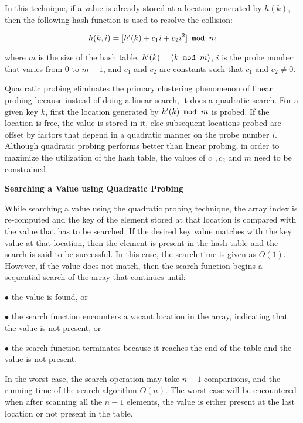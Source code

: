 \vskip 1mm
In this technique, if a value is already stored at a location generated by $h(k)$, then the following hash function is used to resolve the collision:

$$h(k,i)=[h'(k)+c_1i+c_2i^2]\hbox{\tt{} mod }m$$

where $m$ is the size of the hash table, $h'(k)=(k\hbox{\tt{} mod } m)$, $i$ is the probe number that varies from $0$ to $m-1$, and $c_1$ and $c_2$ are constants such that $c_1$ and $c_2\neq 0$.

\vskip 1mm
Quadratic probing eliminates the primary clustering phenomenon of linear probing because instead of doing a linear search, it does a quadratic search. For a given key $k$, first the location generated by $h'(k)\hbox{\tt{} mod }m$ is probed. If the location is free, the value is stored in it, else subsequent locations probed are offset by factors that depend in a quadratic manner on the probe number $i$. Although quadratic probing performs better than linear probing, in order to maximize the utilization of the hash table, the values of $c_1,c_2$ and $m$ need  to be constrained.

\vskip 3mm
{\bf Searching a Value using Quadratic Probing}

\vskip 1mm
While searching a value using the quadratic probing technique, the array index is re-computed and the key of the element stored at that location is compared with the value that has to be searched. If the desired key value matches with the key value at that location, then the element is present in the hash table and the search is said to be successful. In this case, the search time is given as $O(1)$. However, if the value does not match, then the search function begins a sequential search of the array that continues until:

\vskip 3mm
\qquad$\bullet$ the value is found, or

\vskip 3mm
\qquad$\bullet$ the search function encounters a vacant location in the array, indicating that the value is not present, or

\vskip 3mm
\qquad$\bullet$ the search function terminates because it reaches the end of the table and the value is not present.

\vskip 1mm
In the worst case, the search operation may take $n-1$ comparisons, and  the running time of the search algorithm $O(n)$. The worst case will be encountered when after scanning all the $n-1$ elements, the value is either present at the last location or not present in the table.

